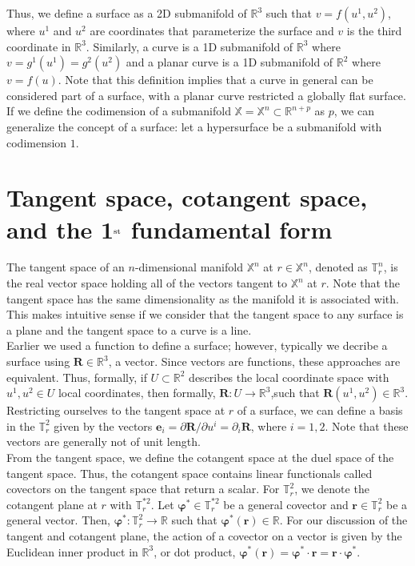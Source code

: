 \begin{appendices}
Thus, we define a surface as a 2D submanifold of $\mathbb{R}^3$ such that $v = f(u^1,u^2)$, where $u^1$ and $u^2$ are coordinates that parameterize the surface and $v$ is the third coordinate in $\mathbb{R}^3$.
Similarly, a curve is a 1D submanifold of $\mathbb{R}^3$ where $v = g^1(u^1) = g^2(u^2)$ and a planar curve is a 1D submanifold of $\mathbb{R}^2$ where $v = f(u)$.
Note that this definition implies that a curve in general can be considered part of a surface, with a planar curve restricted a globally flat surface.
If we define the codimension of a submanifold $\mathbb{X} = \mathbb{X}^n \subset \mathbb{R}^{n + p}$ as $p$, we can generalize the concept of a surface: let a hypersurface be a submanifold with codimension $1$.




\section{Tangent space, cotangent space, and the 1$^{\rm st}$ fundamental form }
The tangent space of an $n$-dimensional manifold $\mathbb{X}^n$ at $r\in \mathbb{X}^n$, denoted as $\mathbb{T}^n_r$, is the real vector space holding all of the vectors tangent to $\mathbb{X}^n$ at $r$.
Note that the tangent space has the same dimensionality as the manifold it is associated with.
This makes intuitive sense if we consider that the tangent space to any surface is a plane and the tangent space to a curve is a line. \\

Earlier we used a function to define a surface; however, typically we decribe a surface using $\mathbf{R} \in \mathbb{R}^3$, a vector.
Since vectors are functions, these approaches are equivalent.
Thus, formally, if $U \subset \mathbb{R}^2$ describes the local coordinate space with $u^1,u^2 \in U$ local coordinates, then formally, $\mathbf{R}:U \rightarrow \mathbb{R}^3$,such that $\mathbf{R}(u^1,u^2) \in \mathbb{R}^3$.
Restricting ourselves to the tangent space at $r$ of a surface, we can define a basis in the $\mathbb{T}^2_r$ given by the vectors $\mathbf{e}_i = \partial \mathbf{R} / \partial u^i = \partial_i \mathbf{R}$, where $i = 1,2$.
Note that these vectors are generally not of unit length. \\

From the tangent space, we define the cotangent space at the duel space of the tangent space.
Thus, the cotangent space contains linear functionals called covectors on the tangent space that return a scalar.
For $\mathbb{T}^2_r$, we denote the cotangent plane at $r$ with $\mathbb{T}^{*2}_r$.
Let $\bm{\varphi}^* \in \mathbb{T}^{*2}_r$ be a general covector and $\mathbf{r} \in \mathbb{T}^{2}_r$ be a general vector.
Then, $\bm{\varphi}^*: \mathbb{T}^2_r \rightarrow \mathbb{R}$ such that $\bm{\varphi}^*(\mathbf{r}) \in \mathbb{R}$.
For our discussion of the tangent and cotangent plane, the action of a covector on a vector is given by the Euclidean inner product in $\mathbb{R}^3$, or dot product, $\bm{\varphi}^*(\mathbf{r}) = \bm{\varphi}^* \cdot \mathbf{r} = \mathbf{r} \cdot \bm{\varphi}^*$. \\


\end{appendices}
